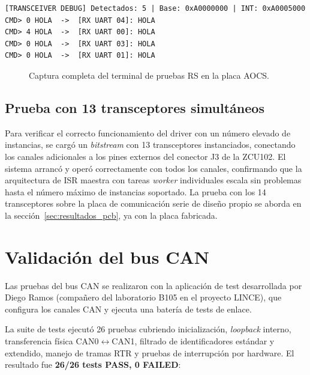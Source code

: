 \begin{lstlisting}[caption={Salida de terminal --- prueba RS422/RS485 con la placa AOCS (5 transceptores)}]
[TRANSCEIVER DEBUG] Detectados: 5 | Base: 0xA0000000 | INT: 0xA0005000
CMD> 0 HOLA  ->  [RX UART 04]: HOLA
CMD> 4 HOLA  ->  [RX UART 00]: HOLA
CMD> 0 HOLA  ->  [RX UART 03]: HOLA
CMD> 0 HOLA  ->  [RX UART 01]: HOLA
\end{lstlisting}

\begin{figure}[H]
    \centering
    \caption{Captura completa del terminal de pruebas RS en la placa AOCS.}
    \label{fig:aocs_rs_terminal}
\end{figure}

\subsection{Prueba con 13 transceptores simultáneos}

Para verificar el correcto funcionamiento del driver con un número elevado de instancias, se
cargó un \textit{bitstream} con 13 transceptores instanciados, conectando los canales adicionales a
los pines externos del conector J3 de la ZCU102. El sistema arrancó y operó correctamente
con todos los canales, confirmando que la arquitectura de ISR maestra con tareas \textit{worker}
individuales escala sin problemas hasta el número máximo de instancias soportado. La prueba
con los 14 transceptores sobre la placa de comunicación serie de diseño propio se aborda en la
sección~\ref{sec:resultados_pcb}, ya con la placa fabricada.

\section{Validación del bus CAN}

Las pruebas del bus CAN se realizaron con la aplicación de test desarrollada por Diego Ramos
(compañero del laboratorio B105 en el proyecto LINCE), que configura los canales CAN y
ejecuta una batería de tests de enlace.

La suite de tests ejecutó 26 pruebas cubriendo inicialización, \textit{loopback} interno,
transferencia física CAN0$\leftrightarrow$CAN1, filtrado de identificadores estándar y
extendido, manejo de tramas RTR y pruebas de interrupción por hardware. El resultado fue
\textbf{26/26 tests PASS, 0 FAILED}:

